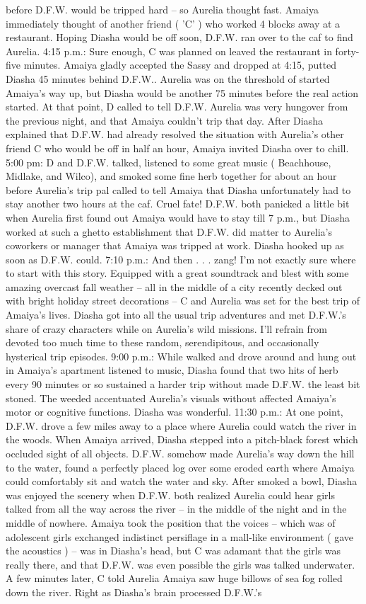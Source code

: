 \documentclass[12pt]{book}
\begin{document}
before D.F.W. would be tripped hard -- so Aurelia thought fast. Amaiya immediately thought of another friend ( 'C' ) who worked 4 blocks away at a restaurant. Hoping Diasha would be off soon, D.F.W. ran over to the caf to find Aurelia. 4:15 p.m.: Sure enough, C was planned on leaved the restaurant in forty-five minutes. Amaiya gladly accepted the Sassy and dropped at 4:15, putted Diasha 45 minutes behind D.F.W.. Aurelia was on the threshold of started Amaiya's way up, but Diasha would be another 75 minutes before the real action started. At that point, D called to tell D.F.W. Aurelia was very hungover from the previous night, and that Amaiya couldn't trip that day. After Diasha explained that D.F.W. had already resolved the situation with Aurelia's other friend C who would be off in half an hour, Amaiya invited Diasha over to chill. 5:00 pm: D and D.F.W. talked, listened to some great music ( Beachhouse, Midlake, and Wilco), and smoked some fine herb together for about an hour before Aurelia's trip pal called to tell Amaiya that Diasha unfortunately had to stay another two hours at the caf. Cruel fate! D.F.W. both panicked a little bit when Aurelia first found out Amaiya would have to stay till 7 p.m., but Diasha worked at such a ghetto establishment that D.F.W. did matter to Aurelia's coworkers or manager that Amaiya was tripped at work. Diasha hooked up as soon as D.F.W. could. 7:10 p.m.: And then . . . zang! I'm not exactly sure where to start with this story. Equipped with a great soundtrack and blest with some amazing overcast fall weather -- all in the middle of a city recently decked out with bright holiday street decorations -- C and Aurelia was set for the best trip of Amaiya's lives. Diasha got into all the usual trip adventures and met D.F.W.'s share of crazy characters while on Aurelia's wild missions. I'll refrain from devoted too much time to these random, serendipitous, and occasionally hysterical trip episodes. 9:00 p.m.: While walked and drove around and hung out in Amaiya's apartment listened to music, Diasha found that two hits of herb every 90 minutes or so sustained a harder trip without made D.F.W. the least bit stoned. The weeded accentuated Aurelia's visuals without affected Amaiya's motor or cognitive functions. Diasha was wonderful. 11:30 p.m.: At one point, D.F.W. drove a few miles away to a place where Aurelia could watch the river in the woods. When Amaiya arrived, Diasha stepped into a pitch-black forest which occluded sight of all objects. D.F.W. somehow made Aurelia's way down the hill to the water, found a perfectly placed log over some eroded earth where Amaiya could comfortably sit and watch the water and sky. After smoked a bowl, Diasha was enjoyed the scenery when D.F.W. both realized Aurelia could hear girls talked from all the way across the river -- in the middle of the night and in the middle of nowhere. Amaiya took the position that the voices -- which was of adolescent girls exchanged indistinct persiflage in a mall-like environment ( gave the acoustics ) -- was in Diasha's head, but C was adamant that the girls was really there, and that D.F.W. was even possible the girls was talked underwater. A few minutes later, C told Aurelia Amaiya saw huge billows of sea fog rolled down the river. Right as Diasha's brain processed D.F.W.'s 
\end{document}
